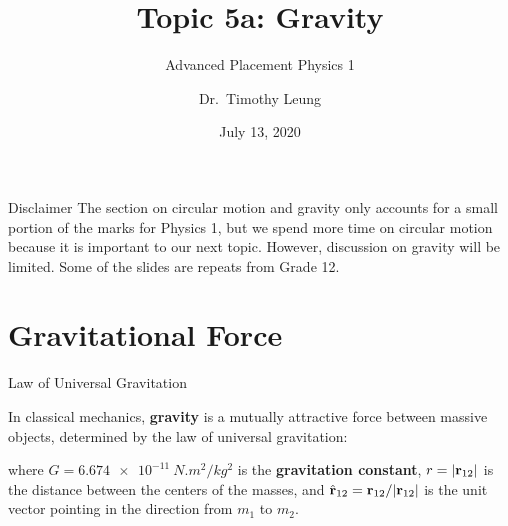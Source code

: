 \documentclass[12pt,compress,aspectratio=169]{beamer}
\title{Topic 5a: Gravity}
\subtitle{Advanced Placement Physics 1}
\author{Dr.\ Timothy Leung}
\institute{Olympiads School\\Toronto, Ontario, Canada}
\date{July 13, 2020}
\newcommand{\mb}[1]{\ensuremath\mathbf{#1}}
\newcommand{\eq}[2]{\vspace{#1}{\Large\begin{displaymath}#2\end{displaymath}}}
\begin{document}
\begin{frame}
  \maketitle
\end{frame}



\begin{frame}{Disclaimer}
  The section on circular motion and gravity only accounts for a small portion
  of the marks for Physics 1, but we spend more time on circular motion because
  it is important to our next topic. However, discussion on gravity will be
  limited. Some of the slides are repeats from Grade 12.
\end{frame}


\section{Gravitational Force}


\begin{frame}{Law of Universal Gravitation}
  \begin{center}
  \end{center}

  In classical mechanics, \textbf{gravity} is a mutually attractive force
  between massive objects, determined by the law of universal gravitation:

  \eq{-.2in}{
    \boxed{
      \mb{F}_{12}=-G\frac{m_1m_2}{|\mb{r}_{12}|^2}\hat{\mb{r}}_{12}}
  }

  where $G=\SI{6.674e-11}{N.m^2/kg^2}$ is the \textbf{gravitation constant},
  $r=|\mb{r}_{12}|$ is the distance between the centers of the masses, and
  $\hat{\mb{r}}_{12}=\mb{r}_{12}/|\mb{r}_{12}|$ is the unit vector pointing in
  the direction from $m_1$ to $m_2$.
\end{frame}
\end{document}

